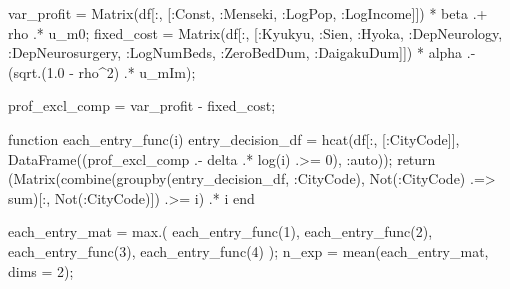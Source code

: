 \documentclass[
  letterpaper,
  DIV=11,
  numbers=noendperiod]{scrreprt}
\newenvironment{Shaded}{\begin{snugshade}}{\end{snugshade}}
\newcommand{\ControlFlowTok}[1]{\textcolor[rgb]{0.00,0.23,0.31}{#1}}
\newcommand{\FloatTok}[1]{\textcolor[rgb]{0.68,0.00,0.00}{#1}}
\newcommand{\FunctionTok}[1]{\textcolor[rgb]{0.28,0.35,0.67}{#1}}
\newcommand{\KeywordTok}[1]{\textcolor[rgb]{0.00,0.23,0.31}{#1}}
\newcommand{\NormalTok}[1]{\textcolor[rgb]{0.00,0.23,0.31}{#1}}
\newcommand{\OperatorTok}[1]{\textcolor[rgb]{0.37,0.37,0.37}{#1}}
\begin{document}
\begin{Shaded}
\begin{Highlighting}[]
\NormalTok{    var\_profit }\OperatorTok{=} \FunctionTok{Matrix}\NormalTok{(df[}\OperatorTok{:}\NormalTok{, [}\OperatorTok{:}\NormalTok{Const, }\OperatorTok{:}\NormalTok{Menseki, }\OperatorTok{:}\NormalTok{LogPop, }\OperatorTok{:}\NormalTok{LogIncome]]) }\OperatorTok{*}\NormalTok{ beta }\OperatorTok{.+} 
\NormalTok{        rho }\OperatorTok{.*}\NormalTok{ u\_m0;}
\NormalTok{    fixed\_cost }\OperatorTok{=} \FunctionTok{Matrix}\NormalTok{(df[}\OperatorTok{:}\NormalTok{, [}\OperatorTok{:}\NormalTok{Kyukyu, }\OperatorTok{:}\NormalTok{Sien, }\OperatorTok{:}\NormalTok{Hyoka, }\OperatorTok{:}\NormalTok{DepNeurology, }\OperatorTok{:}\NormalTok{DepNeurosurgery, }\OperatorTok{:}\NormalTok{LogNumBeds, }\OperatorTok{:}\NormalTok{ZeroBedDum, }\OperatorTok{:}\NormalTok{DaigakuDum]]) }\OperatorTok{*}\NormalTok{ alpha }\OperatorTok{.{-}}
\NormalTok{        (}\FunctionTok{sqrt}\NormalTok{.(}\FloatTok{1.0} \OperatorTok{{-}}\NormalTok{ rho}\OperatorTok{\^{}}\FloatTok{2}\NormalTok{) }\OperatorTok{.*}\NormalTok{ u\_mIm);}

\NormalTok{    prof\_excl\_comp }\OperatorTok{=}\NormalTok{ var\_profit }\OperatorTok{{-}}\NormalTok{ fixed\_cost;}
    
    \KeywordTok{function} \FunctionTok{each\_entry\_func}\NormalTok{(i)}
\NormalTok{        entry\_decision\_df }\OperatorTok{=} \FunctionTok{hcat}\NormalTok{(df[}\OperatorTok{:}\NormalTok{, [}\OperatorTok{:}\NormalTok{CityCode]], }\FunctionTok{DataFrame}\NormalTok{((prof\_excl\_comp }\OperatorTok{.{-}}\NormalTok{ delta }\OperatorTok{.*} \FunctionTok{log}\NormalTok{(i) }\OperatorTok{.\textgreater{}=} \FloatTok{0}\NormalTok{), }\OperatorTok{:}\NormalTok{auto));}
        \ControlFlowTok{return}\NormalTok{ (}\FunctionTok{Matrix}\NormalTok{(}\FunctionTok{combine}\NormalTok{(}\FunctionTok{groupby}\NormalTok{(entry\_decision\_df, }\OperatorTok{:}\NormalTok{CityCode), }\FunctionTok{Not}\NormalTok{(}\OperatorTok{:}\NormalTok{CityCode) }\OperatorTok{.=\textgreater{}}\NormalTok{ sum)[}\OperatorTok{:}\NormalTok{, }\FunctionTok{Not}\NormalTok{(}\OperatorTok{:}\NormalTok{CityCode)]) }\OperatorTok{.\textgreater{}=}\NormalTok{ i) }\OperatorTok{.*}\NormalTok{ i}
    \KeywordTok{end}
    
\NormalTok{    each\_entry\_mat }\OperatorTok{=} \FunctionTok{max}\NormalTok{.(}
        \FunctionTok{each\_entry\_func}\NormalTok{(}\FloatTok{1}\NormalTok{),}
        \FunctionTok{each\_entry\_func}\NormalTok{(}\FloatTok{2}\NormalTok{),}
        \FunctionTok{each\_entry\_func}\NormalTok{(}\FloatTok{3}\NormalTok{),}
        \FunctionTok{each\_entry\_func}\NormalTok{(}\FloatTok{4}\NormalTok{)}
\NormalTok{    );}
\NormalTok{    n\_exp }\OperatorTok{=} \FunctionTok{mean}\NormalTok{(each\_entry\_mat, dims }\OperatorTok{=} \FloatTok{2}\NormalTok{);}
    

\end{Highlighting}
\end{Shaded}
\end{document}
